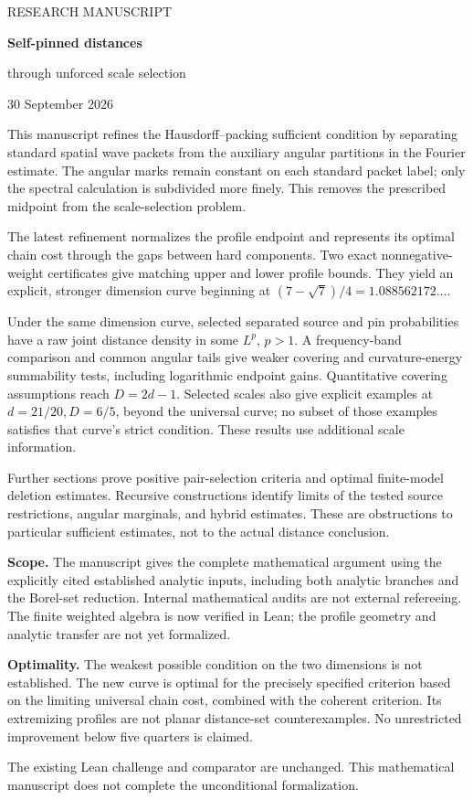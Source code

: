 \documentclass[11pt]{article}
\theoremstyle{definition}\newtheorem{remark}[theorem]{Remark}
\begin{document}
\begin{titlepage}
\vspace*{18mm}
{\large\color{MidnightBlue} RESEARCH MANUSCRIPT}\par
\vspace{8mm}
{\Huge\bfseries Self-pinned distances}\par
\vspace{5mm}
{\LARGE through unforced scale selection}\par
\vspace{12mm}
30 September 2026
\vspace{12mm}

This manuscript refines the Hausdorff--packing sufficient condition by separating
standard spatial wave packets from the auxiliary angular partitions in the
Fourier estimate. The angular marks remain constant on each standard packet
label; only the spectral calculation is subdivided more finely. This removes
the prescribed midpoint from the scale-selection problem.

The latest refinement normalizes the profile endpoint and represents its
optimal chain cost through the gaps between hard components. Two exact
nonnegative-weight certificates give matching upper and lower profile bounds.
They yield an explicit, stronger dimension curve beginning at
\((7-\sqrt7)/4=1.088562172\ldots\).

Under the same dimension curve, selected separated source and pin
probabilities have a raw joint distance density in some \(L^p\), \(p>1\).
A frequency-band comparison and common angular tails give weaker
covering and curvature-energy summability tests, including logarithmic
endpoint gains. Quantitative covering assumptions reach \(D=2d-1\). Selected
scales also give explicit examples at \(d=21/20,D=6/5\), beyond the
universal curve; no subset of those examples satisfies that curve's strict
condition. These results use additional scale information.

Further sections prove positive pair-selection criteria and optimal
finite-model deletion estimates. Recursive constructions identify limits
of the tested source restrictions, angular marginals, and hybrid estimates.
These are obstructions to particular sufficient estimates, not to the
actual distance conclusion.

\textbf{Scope.} The manuscript gives the complete mathematical argument using
the explicitly cited established analytic inputs, including both analytic
branches and the Borel-set reduction. Internal mathematical audits are not
external refereeing. The finite weighted algebra is now verified in Lean;
the profile geometry and analytic transfer are not yet formalized.

\textbf{Optimality.} The weakest possible condition on the two dimensions is
not established. The new curve is optimal for the precisely specified
criterion based on the limiting universal chain cost, combined with the
coherent criterion. Its extremizing profiles are not planar distance-set
counterexamples. No unrestricted improvement below five quarters is claimed.

\vfill
The existing Lean challenge and comparator are unchanged. This mathematical
manuscript does not complete the unconditional formalization.
\end{titlepage}
\end{document}
